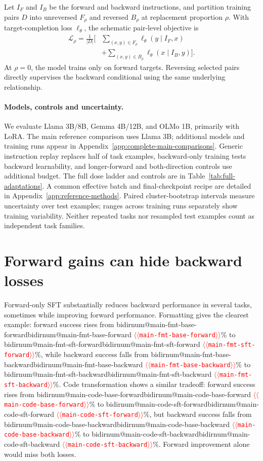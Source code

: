 \documentclass[11pt]{article}
\makeatletter
\providecommand{\NUM}[1]{%
  \ifcsname bidirnum@#1\endcsname\csname bidirnum@#1\endcsname
  \else\textcolor{red}{$\langle\langle$\texttt{#1}$\rangle\rangle$}\fi}
\makeatother
\begin{document}
Let $I_F$ and $I_B$ be the forward and backward instructions, and partition training pairs
$D$ into unreversed $F_\rho$ and reversed $B_\rho$ at replacement proportion $\rho$.
With target-completion loss $\ell_\theta$, the schematic pair-level objective is
\begin{equation}
\begin{aligned}
\mathcal L_\rho = \frac{1}{|D|}\Big[&
\sum_{(x,y)\in F_\rho}\ell_\theta(y\mid I_F,x)\\
&+\sum_{(x,y)\in B_\rho}\ell_\theta(x\mid I_B,y)\Big].
\end{aligned}
\label{eq:replacement}
\end{equation}
At $\rho=0$, the model trains only on forward targets. Reversing selected pairs directly
supervises the backward conditional using the same underlying relationship.

\paragraph{Models, controls and uncertainty.}
We evaluate Llama 3B/8B, Gemma 4B/12B, and OLMo 1B, primarily with LoRA. The main
reference comparison uses Llama 3B; additional models and training runs appear in
Appendix~\ref{app:complete-main-comparisons}. Generic instruction replay replaces half
of task examples, backward-only training tests backward learnability, and longer-forward
and both-direction controls use additional budget. The full dose ladder and controls are
in Table~\ref{tab:full-adaptations}. A common effective batch and final-checkpoint recipe
are detailed in Appendix~\ref{app:reference-methods}. Paired cluster-bootstrap intervals
measure uncertainty over test examples; ranges across training runs separately show
training variability. Neither repeated tasks nor resampled test examples count as independent
task families.

\section{Forward gains can hide backward losses}
\label{sec:general}


Forward-only SFT substantially reduces backward performance in several tasks, sometimes
while improving forward performance. Formatting gives the clearest example: forward
success rises from \NUM{main-fmt-base-forward}\% to \NUM{main-fmt-sft-forward}\%,
while backward success falls from \NUM{main-fmt-base-backward}\% to
\NUM{main-fmt-sft-backward}\%. Code transformation shows a similar tradeoff: forward
success rises from \NUM{main-code-base-forward}\% to \NUM{main-code-sft-forward}\%,
but backward success falls from \NUM{main-code-base-backward}\% to
\NUM{main-code-sft-backward}\%. Forward improvement alone would miss both losses.
\end{document}
